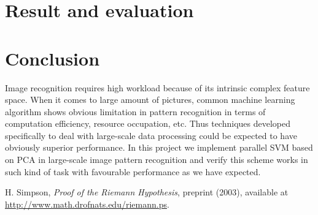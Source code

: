 \documentclass[a4paper]{article}
\begin{document}
\section{Result and evaluation}


\section{Conclusion}
Image recognition requires high workload because of its intrinsic complex feature space. When it comes to large amount of pictures, common machine learning algorithm shows obvious limitation in pattern recognition in terms of computation efficiency, resource occupation, etc. Thus techniques developed specifically to deal with large-scale data processing could be expected to have obviously superior performance. In this project we implement parallel SVM based on PCA in large-scale image pattern recognition and verify this scheme works in such kind of task with favourable performance as we have expected. 

\begin{thebibliography}{}

 H. Simpson, \emph{Proof of the Riemann
Hypothesis},  preprint (2003), available at 
\url{http://www.math.drofnats.edu/riemann.ps}.

\end{thebibliography}
\end{document}
